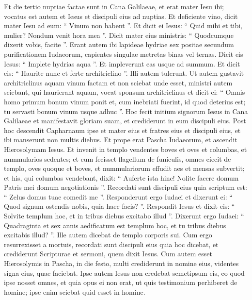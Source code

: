 \begin{biblechapter}
\begin{biblechapter}
\verse Et die tertio nuptiae factae sunt in Cana Galilaeae, et erat mater Iesu ibi; 
\verse vocatus est autem et Iesus et discipuli eius ad nuptias. 
\verse Et deficiente vino, dicit mater Iesu ad eum: “ Vinum non habent ”. 
\verse Et dicit ei Iesus: “ Quid mihi et tibi, mulier? Nondum venit hora mea ”. 
\verse Dicit mater eius ministris: “ Quodcumque dixerit vobis, facite ”.
 \verse Erant autem ibi lapideae hydriae sex positae secundum purificationem Iudaeorum, capientes singulae metretas binas vel ternas. 
\verse Dicit eis Iesus: “ Implete hydrias aqua ”. Et impleverunt eas usque ad summum. 
\verse Et dicit eis: “ Haurite nunc et ferte architriclino ”. Illi autem tulerunt. 
\verse Ut autem gustavit architriclinus aquam vinum factam et non sciebat unde esset, ministri autem sciebant, qui haurierant aquam, vocat sponsum architriclinus 
 \verse et dicit ei: “ Omnis homo primum bonum vinum ponit et, cum inebriati fuerint, id quod deterius est; tu servasti bonum vinum usque adhuc ”. 
\verse Hoc fecit initium signorum Iesus in Cana Galilaeae et manifestavit gloriam suam, et crediderunt in eum discipuli eius.
 \verse Post hoc descendit Capharnaum ipse et mater eius et fratres eius et discipuli eius, et ibi manserunt non multis diebus.
 \verse Et prope erat Pascha Iudaeorum, et ascendit Hierosolymam Iesus. 
\verse Et invenit in templo vendentes boves et oves et columbas, et nummularios sedentes; 
 \verse et cum fecisset flagellum de funiculis, omnes eiecit de templo, oves quoque et boves, et nummulariorum effudit aes et mensas subvertit; 
\verse et his, qui columbas vendebant, dixit: “ Auferte ista hinc! Nolite facere domum Patris mei domum negotiationis ”. 
\verse Recordati sunt discipuli eius quia scriptum est: “ Zelus domus tuae comedit me ”. 
\verse Responderunt ergo Iudaei et dixerunt ei: “ Quod signum ostendis nobis, quia haec facis? ”. 
\verse Respondit Iesus et dixit eis: “ Solvite templum hoc, et in tribus diebus excitabo illud ”. 
\verse Dixerunt ergo Iudaei: “ Quadraginta et sex annis aedificatum est templum hoc, et tu tribus diebus excitabis illud? ”. 
\verse Ille autem dicebat de templo corporis sui. 
\verse Cum ergo resurrexisset a mortuis, recordati sunt discipuli eius quia hoc dicebat, et crediderunt Scripturae et sermoni, quem dixit Iesus.
 \verse Cum autem esset Hierosolymis in Pascha, in die festo, multi crediderunt in nomine eius, videntes signa eius, quae faciebat. 
\verse Ipse autem Iesus non credebat semetipsum eis, eo quod ipse nosset omnes, 
\verse et quia opus ei non erat, ut quis testimonium perhiberet de homine; ipse enim sciebat quid esset in homine.
 

\end{biblechapter}
\end{biblechapter}
